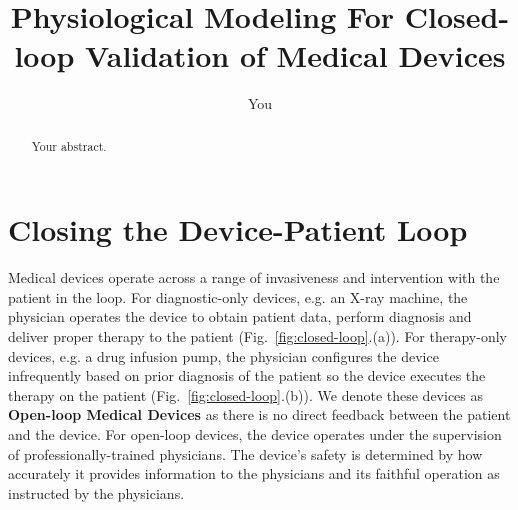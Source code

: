 \documentclass[a4paper]{article}
\title{Physiological Modeling For Closed-loop Validation of Medical Devices}
\author{You}
\newcommand{\figref}[1]{Fig.~\ref{fig:#1}}
\begin{document}
\maketitle

\begin{abstract}
Your abstract.
\end{abstract}

\section{Closing the Device-Patient Loop}
Medical devices operate across a range of invasiveness and intervention with the patient in the loop. For diagnostic-only devices, e.g. an X-ray machine, the physician operates the device to obtain patient data, perform diagnosis and deliver proper therapy to the patient (\figref{closed-loop}.(a)). For therapy-only devices, e.g. a drug infusion pump, the physician configures the device infrequently based on prior diagnosis of the patient so the device executes the therapy on the patient (\figref{closed-loop}.(b)). We denote these devices as \textbf{Open-loop Medical Devices} as there is no direct feedback between the patient and the device. For open-loop devices, the device operates under the supervision of professionally-trained physicians. The device's safety is determined by how accurately it provides information to the physicians and its faithful operation as instructed by the physicians.
\end{document}
